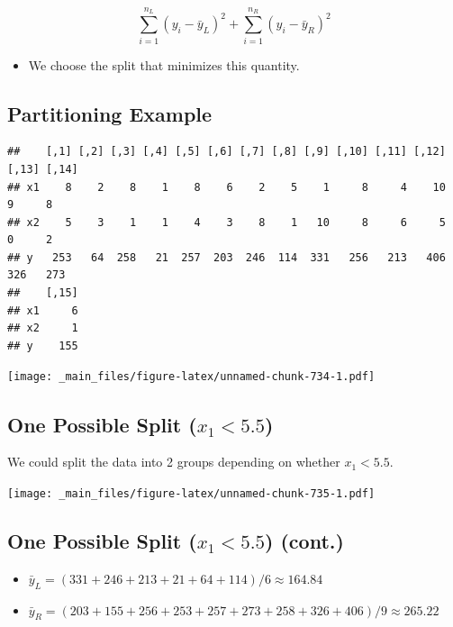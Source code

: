 \documentclass[]{book}
\providecommand{\tightlist}{%
  \setlength{\itemsep}{0pt}\setlength{\parskip}{0pt}}
\begin{document}
\[ \displaystyle\sum_{i=1}^{n_L} (y_i -\bar{y}_L)^2 + \displaystyle\sum_{i=1}^{n_R} (y_i -\bar{y}_R)^2
\]

\begin{itemize}
\tightlist
\item
  We choose the split that minimizes this quantity.
\end{itemize}

\subsection{Partitioning Example}\label{partitioning-example}

\begin{verbatim}
##    [,1] [,2] [,3] [,4] [,5] [,6] [,7] [,8] [,9] [,10] [,11] [,12] [,13] [,14]
## x1    8    2    8    1    8    6    2    5    1     8     4    10     9     8
## x2    5    3    1    1    4    3    8    1   10     8     6     5     0     2
## y   253   64  258   21  257  203  246  114  331   256   213   406   326   273
##    [,15]
## x1     6
## x2     1
## y    155
\end{verbatim}

\texttt{[image: \_main\_files/figure-latex/unnamed-chunk-734-1.pdf]}

\subsection{\texorpdfstring{One Possible Split
(\(x_1 < 5.5\))}{One Possible Split (x\_1 \textless{} 5.5)}}\label{one-possible-split-x_1-5.5}

We could split the data into 2 groups depending on whether
\(x_1 < 5.5\).

\texttt{[image: \_main\_files/figure-latex/unnamed-chunk-735-1.pdf]}

\subsection{\texorpdfstring{One Possible Split (\(x_1 < 5.5\))
(cont.)}{One Possible Split (x\_1 \textless{} 5.5) (cont.)}}\label{one-possible-split-x_1-5.5-cont.}

\begin{itemize}
\tightlist
\item
  \(\bar{y}_L = (331+246+213+21+64+114)/6 \approx 164.84\)\\
\item
  \(\bar{y}_R = (203+155+256+253+257+273+258+326+406)/9 \approx 265.22\)
\end{itemize}
\end{document}
